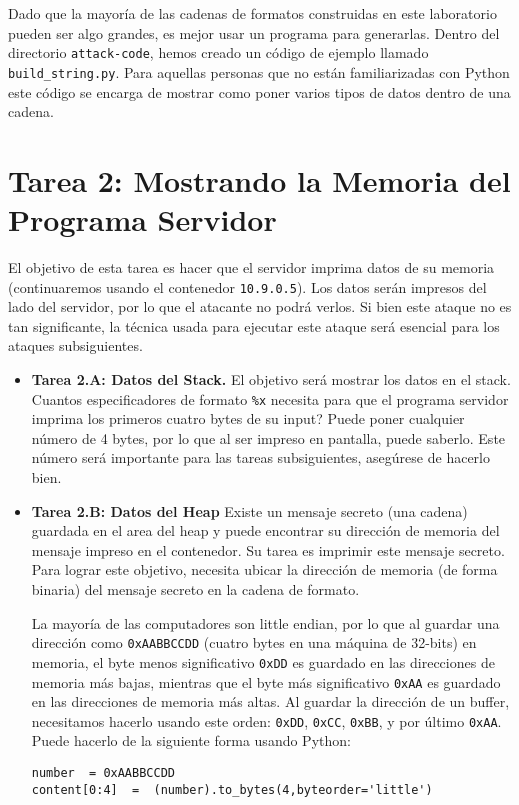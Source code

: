 Dado que la mayoría de las cadenas de formatos construidas en este laboratorio pueden ser algo grandes, es mejor usar un programa para generarlas. Dentro del directorio  \texttt{attack-code}, hemos creado un código de ejemplo llamado  \texttt{build\_string.py}. Para aquellas personas que no están familiarizadas con Python este código se encarga de mostrar como poner varios tipos de datos dentro de una cadena.



\section{Tarea 2: Mostrando la Memoria del Programa Servidor}

El objetivo de esta tarea es hacer que el servidor imprima datos de su memoria (continuaremos usando el contenedor \texttt{10.9.0.5}).
Los datos serán impresos del lado del servidor, por lo que el atacante no podrá verlos. Si bien este ataque no es tan significante, la técnica usada para ejecutar este ataque será esencial para los ataques subsiguientes.


\begin{itemize} 
\item \textbf{Tarea 2.A: Datos del Stack.}
El objetivo será mostrar los datos en el stack.
Cuantos especificadores de formato \texttt{\%x} necesita para que el programa servidor imprima los primeros cuatro bytes de su input? Puede poner cualquier número de 4 bytes, por lo que al ser impreso en pantalla, puede saberlo.
Este número será importante para las tareas subsiguientes, asegúrese de hacerlo bien.

\item \textbf{Tarea 2.B: Datos del Heap} 
Existe un mensaje secreto (una cadena) guardada en el area del heap y puede encontrar su dirección de memoria del mensaje impreso en el contenedor.
Su tarea es imprimir este mensaje secreto.
Para lograr este objetivo, necesita ubicar la dirección de memoria (de forma binaria) del mensaje secreto en la cadena de formato.

La mayoría de las computadores son little endian, por lo que al guardar una dirección como \texttt{0xAABBCCDD} (cuatro bytes en una máquina de 32-bits) en memoria, el byte menos significativo \texttt{0xDD} es guardado en las direcciones de memoria más bajas, mientras que el byte más significativo \texttt{0xAA} es guardado en las direcciones de memoria más altas. 
Al guardar la dirección de un buffer, necesitamos hacerlo usando este orden: \texttt{0xDD}, \texttt{0xCC}, \texttt{0xBB}, y por último \texttt{0xAA}.
Puede hacerlo de la siguiente forma usando Python:

\begin{lstlisting}
number  = 0xAABBCCDD
content[0:4]  =  (number).to_bytes(4,byteorder='little')
\end{lstlisting}
     
\end{itemize} 





